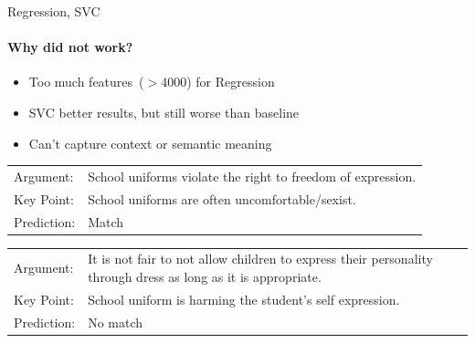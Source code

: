 \documentclass[english,handout]{mlutalk}
\begin{document}
\begin{frame}{Regression, SVC}

  \framesubtitle{Why did not work?}

  \begin{itemize}
    \item Too much features~(\( > 4000 \)) for Regression
    \item SVC better results, but still worse than baseline
    \item Can't capture context or semantic meaning
  \end{itemize}

  \begin{example}
    \smaller
    \begin{tabular}{ll}
      Argument: & School uniforms violate the right to freedom of expression. \\
      Key Point: & School uniforms are often uncomfortable/sexist. \\
      Prediction: & Match
    \end{tabular}
  \end{example}
  
  \begin{example}
    \smaller
    \begin{tabular}{ll}
      Argument: & It is not fair to not allow children to express their personality through dress as long as it is appropriate. \\
      Key Point: & School uniform is harming the student's self expression. \\
      Prediction: & No match
    \end{tabular}
  \end{example}

\end{frame}
\end{document}
